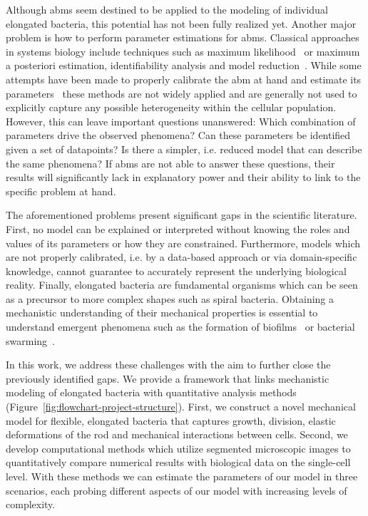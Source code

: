 Although \acp{abm} seem destined to be applied to the modeling of individual elongated bacteria,
this potential has not been fully realized yet.
Another major problem is how to perform parameter estimations for \acp{abm}.
Classical approaches in systems biology include techniques such as maximum
likelihood~\cite{Kreutz2013,Raue2014} or maximum a posteriori estimation, identifiability analysis
and model reduction~\cite{Simpson2025,Gbor2015,Banga2008,Ashyraliyev2009}.
While some attempts have been made to properly calibrate the \ac{abm} at hand and estimate its
parameters~\cite{An2016,Lima2021,Dancik2010,Thiele2014} these methods are not widely applied and are
generally not used to explicitly capture any possible heterogeneity within the cellular population.
However, this can leave important questions unanswered:
Which combination of parameters drive the observed phenomena?
Can these parameters be identified given a set of datapoints?
Is there a simpler, i.e. reduced model that can describe the same phenomena?
If \acp{abm} are not able to answer these questions, their results will significantly lack in
explanatory power and their ability to link to the specific problem at hand.

The aforementioned problems present significant gaps in the scientific literature.
First, no model can be explained or interpreted without knowing the roles and values of its
parameters or how they are constrained.
Furthermore, models which are not properly calibrated, i.e. by a data-based approach or via
domain-specific knowledge, cannot guarantee to accurately represent the underlying
biological reality.
Finally, elongated bacteria are fundamental organisms which can be seen as a precursor to
more complex shapes such as spiral bacteria.
Obtaining a mechanistic understanding of their mechanical properties is essential to understand
emergent phenomena such as the formation of biofilms~\cite{Li2025} or bacterial
swarming~\cite{Starru2007}.

In this work, we address these challenges with the aim to further close the previously identified
gaps.
We provide a framework that links mechanistic modeling of elongated bacteria with quantitative
analysis methods (Figure~\ref{fig:flowchart-project-structure}).
First, we construct a novel mechanical model for flexible, elongated bacteria that captures growth,
division, elastic deformations of the rod and mechanical interactions between cells.
Second, we develop computational methods which utilize segmented microscopic images to
quantitatively
compare numerical results with biological data on the single-cell level.
With these methods we can estimate the parameters of our model in three scenarios, each probing
different aspects of our model with increasing levels of complexity.

